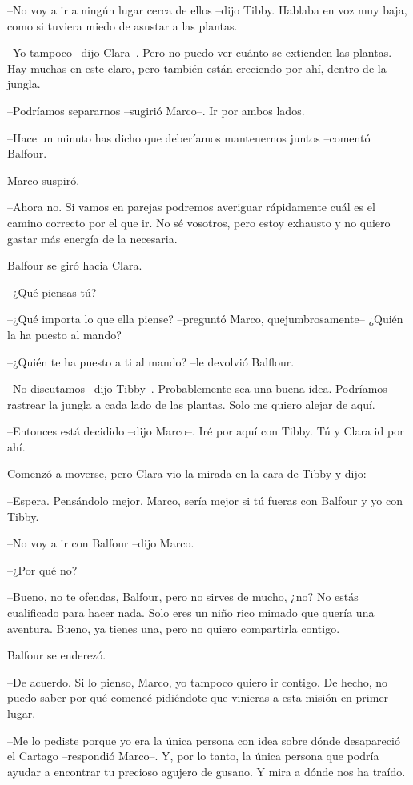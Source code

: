 {--No voy a ir a ningún lugar cerca de ellos --dijo Tibby. Hablaba en voz
muy baja, como si tuviera miedo de asustar a las plantas.}

{--Yo tampoco --dijo Clara--. Pero no puedo ver cuánto se extienden las
 plantas. Hay muchas en este claro, pero también están creciendo por ahí,
dentro de la jungla.}

{--Podríamos separarnos --sugirió Marco--. Ir por ambos lados.}

{--Hace un minuto has dicho que deberíamos mantenernos juntos --comentó
Balfour.}

{Marco suspiró.}

{--Ahora no. Si vamos en parejas podremos averiguar rápidamente cuál es
 el camino correcto por el que ir. No sé vosotros, pero estoy exhausto y
no quiero gastar más energía de la necesaria.}

{Balfour se giró hacia Clara.}

{--¿Qué piensas tú?}

{--¿Qué importa lo que ella piense? --preguntó Marco, quejumbrosamente--
¿Quién la ha puesto al mando?}

{--¿Quién te ha puesto a ti al mando? --le devolvió Balflour.}

{--No discutamos --dijo Tibby--. Probablemente sea una buena idea.
 Podríamos rastrear la jungla a cada lado de las plantas. Solo me quiero
alejar de aquí.}

{--Entonces está decidido --dijo Marco--. Iré por aquí con Tibby. Tú y
Clara id por ahí.}

{Comenzó a moverse, pero Clara vio la mirada en la cara de Tibby y
dijo:}

{--Espera. Pensándolo mejor, Marco, sería mejor si tú fueras con Balfour
y yo con Tibby.}

{--No voy a ir con Balfour --dijo Marco.}

{--¿Por qué no?}

{--Bueno, no te ofendas, Balfour, pero no sirves de mucho, ¿no? No estás
 cualificado para hacer nada. Solo eres un niño rico mimado que quería
 una aventura. Bueno, ya tienes una, pero no quiero compartirla
contigo.}

{Balfour se enderezó.}

{--De acuerdo. Si lo pienso, Marco, yo tampoco quiero ir contigo. De
 hecho, no puedo saber por qué comencé pidiéndote que vinieras a esta
misión en primer lugar.}

{--Me lo pediste porque yo era la única persona con idea sobre dónde
 desapareció el Cartago --respondió Marco--. Y, por lo tanto, la única
 persona que podría ayudar a encontrar tu precioso agujero de gusano. Y
mira a dónde nos ha traído.}

